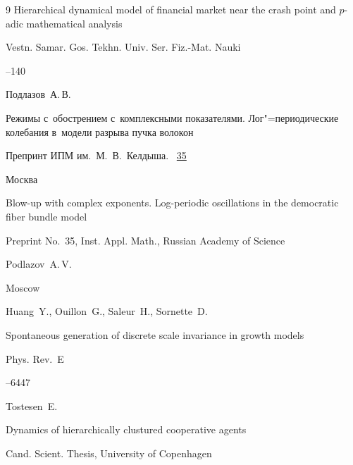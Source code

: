 \begin{thebibliography}{9}
\paper Hierarchical dynamical model of financial market near the crash point and   $p$-adic mathematical analysis


\jour Vestn. Samar. Gos. Tekhn. Univ. Ser. Fiz.-Mat. Nauki


--140






\by Подлазов~А.\,В.

\preprint Режимы с~обострением с~комплексными показателями. Лог"=периодические колебания в~модели разрыва пучка волокон

\preprintinfo Препринт ИПМ им.~М.~В.~Келдыша. \No~\href{http://library.keldysh.ru/preprint.asp?id=2009-35}{35}

\publaddr Москва



\misctransl

\preprint Blow-up with complex exponents. Log-periodic oscillations in the democratic fiber bundle model

\preprintinfo Preprint No.~35, Inst. Appl. Math., Russian Academy of Science

\by Podlazov~A.\,V.


\publaddr Moscow





\by  Huang~Y.,  Ouillon~G.,  Saleur~H., Sornette~D.

\paper Spontaneous generation of discrete scale invariance in growth models

\jour Phys. Rev.~E




--6447






\by Tostesen~E.

\thesis Dynamics of hierarchically clustured cooperative agents

\thesisinfo Cand. Scient. Thesis, University of Copenhagen




\end{thebibliography}







